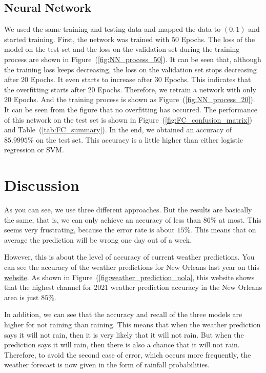 \documentclass[11pt, a4paper, jou]{apa7}
\begin{document}
\subsection{Neural Network}
We used the same training and testing data and mapped the data to $(0,1)$ and started training. First, the network was trained with $50$ Epochs. The loss of the model on the test set and the loss on the validation set during the training process are shown in Figure~(\ref{fig:NN_process_50}). It can be seen that, although the training loss keeps decreasing, the loss on the validation set stops decreasing after $20$ Epochs. It even starts to increase after $30$ Epochs. This indicates that the overfitting starts after $20$ Epochs. Therefore, we retrain a network with only $20$ Epochs. And the training process is shown as Figure~(\ref{fig:NN_process_20}). It can be seen from the figure that no overfitting has occurred. The performance of this network on the test set is shown in Figure~(\ref{fig:FC_confusion_matrix}) and Table~(\ref{tab:FC_summary}). In the end, we obtained an accuracy of $85.9995\%$ on the test set. This accuracy is a little higher than either logistic regression or SVM. 

\section{Discussion}

As you can see, we use three different approaches. But the results are basically the same, that is, we can only achieve an accuracy of less than $86\%$ at most. This seems very frustrating, because the error rate is about $15\%$. This means that on average the prediction will be wrong one day out of a week. 

However, this is about the level of accuracy of current weather predictions. You can see the accuracy of the weather predictions for New Orleans last year on this \href{https://www.forecastadvisor.com/Louisiana/NewOrleans/70112/}{website}. As shown in Figure~(\ref{fig:weather_prediction_nola}, this website shows that the highest channel for 2021 weather prediction accuracy in the New Orleans area is just $85\%$. 

In addition, we can see that the accuracy and recall of the three models are higher for not raining than raining. This means that when the weather prediction says it will not rain, then it is very likely that it will not rain. But when the prediction says it will rain, then there is also a chance that it will not rain. Therefore, to avoid the second case of error, which occurs more frequently, the weather forecast is now given in the form of rainfall probabilities. 
\end{document}
